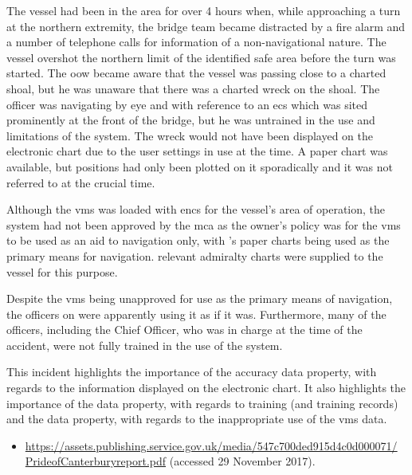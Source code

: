 The vessel had been in the area for over 4 hours when, while approaching a turn at the northern extremity, the bridge team became distracted by a fire alarm and a number of telephone calls for \gls{information} of a non-navigational nature. The vessel overshot the northern limit of the identified safe area before the turn was started. The \gls{oow} became aware that the vessel was passing close to a charted shoal, but he was unaware that there was a charted wreck on the shoal. The officer was navigating by eye and with reference to an \gls{ecs} which was sited prominently at the front of the bridge, but he was untrained in the use and limitations of the system. The wreck would not have been displayed on the electronic chart due to the user settings in use at the time. A paper chart was available, but positions had only been plotted on it sporadically and it was not referred to at the crucial time.

Although the \gls{vms} was loaded with \glspl{enc} for the vessel's area of operation, the system had not been approved by the \gls{mca} as the owner's policy was for the \gls{vms} to be used as an aid to navigation only, with 's paper charts being used as the primary means for navigation. relevant admiralty charts were supplied to the vessel for this purpose.

Despite the \gls{vms} being unapproved for use as the primary means of navigation, the officers on  were apparently using it as if it was. Furthermore, many of the officers, including the Chief Officer, who was in charge at the time of the accident, were not fully trained in the use of the system.

This incident highlights the importance of the \gls{accuracy} \gls{data property}, with regards to the \gls{information} displayed on the electronic chart. It also highlights the importance of the  \gls{data property}, with regards to training (and training records) and the  \gls{data property}, with regards to the inappropriate use of the \gls{vms} data.

\begin{samepage}
\begin{itemize}
  \item \raggedright{\href{https://assets.publishing.service.gov.uk/media/547c700ded915d4c0d000071/PrideofCanterburyreport.pdf}{https://assets.publishing.service.gov.uk/media/547c700ded915d4c0d000071/ PrideofCanterburyreport.pdf} (accessed 29 November 2017).}
\end{itemize}
\end{samepage}


